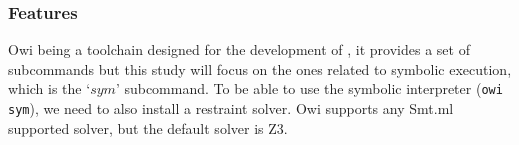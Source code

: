 \subsubsection{Features}

Owi being a toolchain designed for the development of , it provides a set of subcommands but this study will focus on the ones related to symbolic execution, which is the `$sym$' subcommand.
To be able to use the symbolic interpreter (\lstinline$owi sym$), we need to also install a restraint solver. Owi supports any Smt.ml supported solver, but the default solver is Z3.




